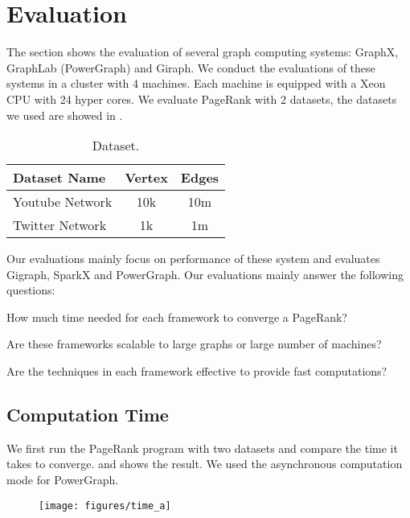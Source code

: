 \section{Evaluation} \label{eval}
The section shows the evaluation of several graph computing systems:
GraphX, GraphLab (PowerGraph) and Giraph.
We conduct the evaluations of these systems in a cluster with 4 machines.
Each machine is equipped with a Xeon CPU with 24 hyper cores.
We evaluate PageRank with 2 datasets, the datasets we used are showed in
.

\begin{table}[tbh]
  \center
  \begin{tabular}{l|c|c}
    \textbf{Dataset Name} & \textbf{Vertex} & \textbf{Edges} \\
      \hline
      Youtube Network & 10k & 10m \\
      \hline
      Twitter Network & 1k & 1m
  \end{tabular}
  \caption{Dataset.}
  \label{tab:dataset}
\end{table}

Our evaluations mainly focus on performance of these system and evaluates
Gigraph, SparkX and PowerGraph.
Our evaluations mainly answer the following questions:
\begin{tightenum}

\item[\S\ref{subsec:time}:] How much time needed for each framework
to converge a PageRank?

\item[\S\ref{subsec:scalability}:] Are these frameworks scalable to
large graphs or large number of machines?

\item[\S\ref{subsec:technique}:] Are the techniques in each framework
effective to provide fast computations?
\end{tightenum}

\subsection{Computation Time} \label{subsec:time}
We first run the PageRank program with two datasets and compare the
time it takes to converge.  and 
shows the result. We used the asynchronous computation mode
for PowerGraph.

\begin{figure}[t]
  \texttt{[image: figures/time\_a]}
  \caption{}
  \label{fig:time:a}
\end{figure}

